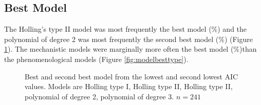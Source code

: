 \documentclass{article}
\begin{document}
\subsection{Best Model}
The Holling's type II model was most frequently the best model ($\%$) and the polynomial of degree 2 was most frequently the second best model ($\%$) (Figure \ref{fig:bestmodel}).
The mechanistic models were marginally more often the best model ($\%$)than the phenomenological models (Figure \ref{fig:modelbesttype}).
\begin{figure}[ht!]
\centering
{}
\caption{Best and second best model from the lowest and second lowest AIC values. Models are Holling type I, Holling type II, Holling type II, polynomial of degree 2, polynomial of degree 3. $n=241$}
\label{fig:bestmodel}
\end{figure}
\end{document}
